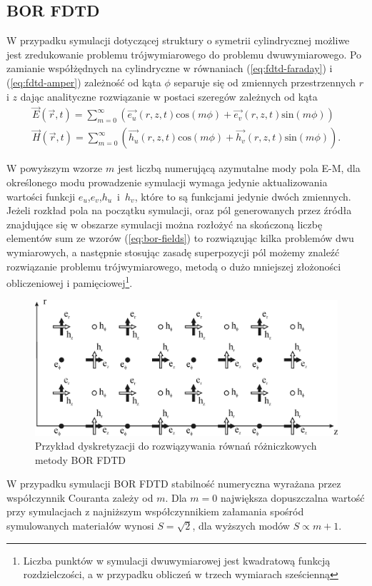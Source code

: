 \subsection{BOR FDTD}
\label{subart:borfdtd}
W przypadku symulacji dotyczącej struktury o symetrii cylindrycznej możliwe jest zredukowanie problemu trójwymiarowego do problemu dwuwymiarowego. Po zamianie współżędnych na cylindryczne w równaniach (\ref{eq:fdtd-faraday}) i (\ref{eq:fdtd-amper}) zależność od kąta $\phi$ separuje się od zmiennych przestrzennych $r$ i $z$ dając analityczne rozwiązanie w postaci szeregów zależnych od kąta
\begin{equation}
	\begin{gathered}
	\vec{E}(\vec{r},t)=\sum_{m=0}^{\infty}(\vec{e_u}(r,z,t) \textrm{cos}(m\phi)+\vec{e_v}(r,z,t)\textrm{sin}(m\phi)) \\
	\vec{H}(\vec{r},t)=\sum_{m=0}^{\infty}(\vec{h_u}(r,z,t) \textrm{cos}(m\phi)+\vec{h_v}(r,z,t)\textrm{sin}(m\phi)).
	\end{gathered}
	\label{eq:bor-fields}
\end{equation}

W powyższym wzorze $m$ jest liczbą numerującą azymutalne mody pola E-M, dla określonego modu prowadzenie symulacji wymaga jedynie aktualizowania wartości funkcji $e_u$,$e_v$,$h_u$~i~$h_v$, które to są funkcjami jedynie dwóch zmiennych. Jeżeli rozkład pola na początku symulacji, oraz pól generowanych przez źródła znajdujące się w obszarze symulacji można rozłożyć na skończoną liczbę elementów sum ze wzorów (\ref{eq:bor-fields}) to rozwiązując kilka problemów dwu wymiarowych, a następnie stosując zasadę superpozycji pól możemy znaleźć rozwiązanie problemu trójwymiarowego, metodą o dużo mniejszej złożoności obliczeniowej i pamięciowej\footnote{Liczba punktów w symulacji dwuwymiarowej jest kwadratową funkcją rozdzielczości, a w przypadku obliczeń w trzech wymiarach sześcienną}.

\begin{figure}
	\includegraphics[width=\textwidth]{subart/fdtd/R5_TFSF.png}
	\caption{Przykład dyskretyzacji do rozwiązywania równań różniczkowych metody BOR FDTD \cite{antosiewicz2009wplyw}}
	\label{fig:bor-dysk}
\end{figure}
W przypadku symulacji BOR FDTD stabilność numeryczna wyrażana przez współczynnik Couranta zależy od $m$. Dla $m=0$ największa dopuszczalna wartość przy symulacjach z najniższym współczynnikiem załamania spośród symulowanych materiałów wynosi $S=\sqrt{2}$, dla wyższych modów $S \propto m+1$.

